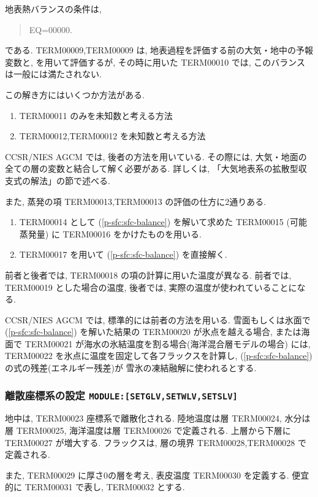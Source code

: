 地表熱バランスの条件は,
%
\begin{quote}
EQ=00000.
\label{p-sfc:sfc-balance}
\end{quote}
%
である.
TERM00009,TERM00009 は,
地表過程を評価する前の大気・地中の予報変数と,
を用いて評価するが, 
その時に用いた TERM00010 では, このバランスは一般には満たされない.

この解き方にはいくつか方法がある.
\begin{enumerate}
\item TERM00011 のみを未知数と考える方法
\item TERM00012,TERM00012 を未知数と考える方法
\end{enumerate}
CCSR/NIES AGCM では, 後者の方法を用いている.
その際には, 大気・地面の全ての層の変数と結合して解く必要がある.
詳しくは, 「大気地表系の拡散型収支式の解法」の節で述べる.

また, 蒸発の項 TERM00013,TERM00013 の評価の仕方に2通りある.
\begin{enumerate}
\item TERM00014 として
      (\ref{p-sfc:sfc-balance}) を解いて求めた TERM00015 
      (可能蒸発量) に  TERM00016 をかけたものを用いる.

\item TERM00017 を用いて
      (\ref{p-sfc:sfc-balance}) を直接解く.
\end{enumerate}
前者と後者では, TERM00018 の項の計算に用いた温度が異なる.
前者では, TERM00019 とした場合の温度,
後者では, 実際の温度が使われていることになる.

CCSR/NIES AGCM では, 標準的には前者の方法を用いる.
雪面もしくは氷面で (\ref{p-sfc:sfc-balance}) を解いた結果の
TERM00020 が氷点を越える場合, 
または海面で TERM00021 が海水の氷結温度を割る場合(海洋混合層モデルの場合)
には, TERM00022 を氷点に温度を固定して各フラックスを計算し,
(\ref{p-sfc:sfc-balance}) の式の残差(エネルギー残差)が
雪氷の凍結融解に使われるとする.

\subsubsection{離散座標系の設定 \texttt{MODULE:[SETGLV,SETWLV,SETSLV]}}

地中は, TERM00023 座標系で離散化される.
陸地温度は層 TERM00024, 水分は層 TERM00025, 
海洋温度は層 TERM00026 で定義される.
上層から下層に TERM00027 が増大する.
フラックスは, 層の境界 TERM00028,TERM00028 で定義される.

また, TERM00029 に厚さ0の層を考え,
表皮温度 TERM00030 を定義する.
便宜的に TERM00031 で表し, TERM00032 とする.

